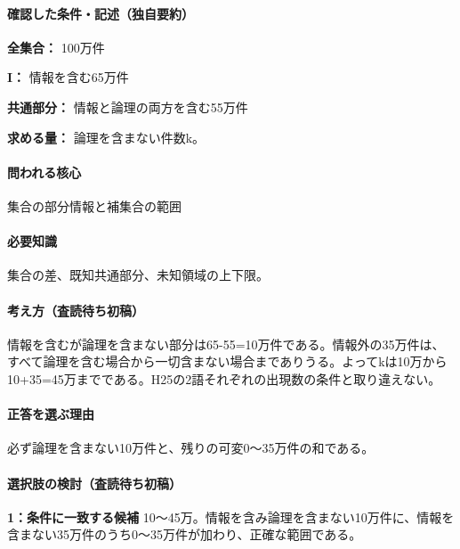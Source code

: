 \paragraph{確認した条件・記述（独自要約）}\mbox{}\par

\noindent\textbf{全集合：} 100万件\par

\noindent\textbf{I：} 情報を含む65万件\par

\noindent\textbf{共通部分：} 情報と論理の両方を含む55万件\par

\noindent\textbf{求める量：} 論理を含まない件数k。\par

\paragraph{問われる核心} 集合の部分情報と補集合の範囲

\paragraph{必要知識} 集合の差、既知共通部分、未知領域の上下限。

\paragraph{考え方（査読待ち初稿）} 情報を含むが論理を含まない部分は65-55=\allowbreak{}10万件である。情報外の35万件は、すべて論理を含む場合から一切含まない場合までありうる。よってkは10万から10+35=\allowbreak{}45万までである。H25の2語それぞれの出現数の条件と取り違えない。

\paragraph{正答を選ぶ理由} 必ず論理を含まない10万件と、残りの可変0〜35万件の和である。

\paragraph{選択肢の検討（査読待ち初稿）}\mbox{}\par

\noindent\textbf{1：条件に一致する候補} 10〜45万。情報を含み論理を含まない10万件に、情報を含まない35万件のうち0〜35万件が加わり、正確な範囲である。\par

